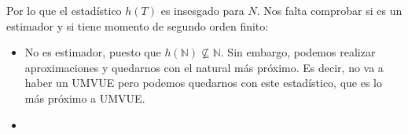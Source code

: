 \begin{ejercicio}
    Por lo que el estadístico $h(T)$ es insesgado para $N$. Nos falta comprobar si es un estimador y si tiene momento de segundo orden finito:
    \begin{itemize}
        \item No es estimador, puesto que $h(\mathbb{N})\nsubseteq \mathbb{N}$. Sin embargo, podemos realizar aproximaciones y quedarnos con el natural más próximo. Es decir, no va a haber un UMVUE pero podemos quedarnos con este estadístico, que es lo más próximo a UMVUE.
        \item %
    \end{itemize}


\end{ejercicio}


